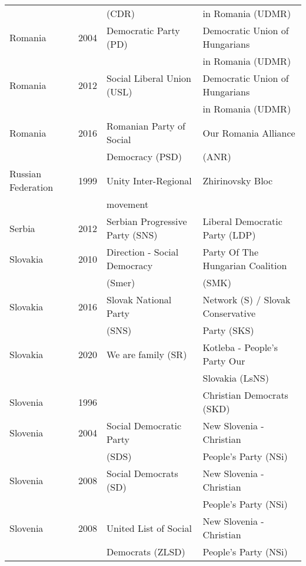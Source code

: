 {\begin{longtable}{|l|c|l|l|}
               &      &      (CDR)     &   in Romania (UDMR)  \\ 
   Romania & 2004 &   Democratic Party (PD) &   Democratic Union of Hungarians  \\ 
               &      &         &    in Romania (UDMR) \\ 
   Romania & 2012 &   Social Liberal Union (USL)   &   Democratic Union of Hungarians \\ 
               &      &         &   in Romania (UDMR)   \\ 
   Romania & 2016 &   Romanian Party of Social   &   Our Romania Alliance  \\ 
               &      &      Democracy (PSD)    &   (ANR)  \\ 
   Russian Federation & 1999 &   Unity Inter-Regional &   Zhirinovsky Bloc \\ 
               &      &      movement    &     \\ 
   Serbia & 2012 &   Serbian Progressive Party (SNS)   &   Liberal Democratic Party (LDP)   \\ 
   Slovakia & 2010 &   Direction - Social Democracy &   Party Of The Hungarian Coalition  \\ 
               &      &      (Smer)    &    (SMK) \\ 
   Slovakia & 2016 &   Slovak National Party &   Network (S) / Slovak Conservative   \\ 
               &      &      (SNS)    &    Party (SKS)  \\ 
   Slovakia & 2020 &   We are family (SR) &   Kotleba - People's Party Our    \\ 
               &      &         &  Slovakia (LsNS)   \\ 
   Slovenia & 1996 &  &   Christian Democrats (SKD)   \\ 
   Slovenia & 2004 &        Social Democratic Party &   New Slovenia - Christian    \\ 
               &      &      (SDS)    &    People's Party (NSi) \\ 
   Slovenia & 2008 &   Social Democrats (SD)  &   New Slovenia - Christian   \\ 
               &      &         &   People's Party (NSi)   \\ 
   Slovenia & 2008 &   United List of Social  &   New Slovenia - Christian   \\ 
               &      &     Democrats (ZLSD)    &   People's Party (NSi)   \\ 

\end{longtable}}
